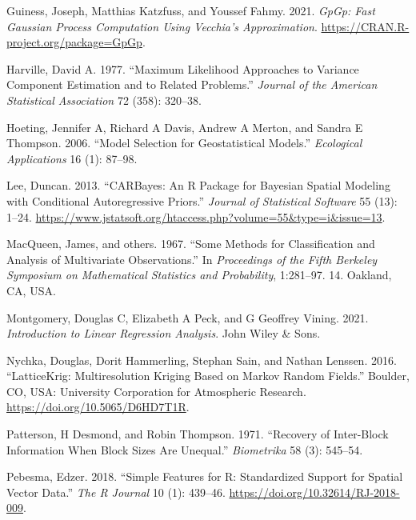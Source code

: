 \documentclass{article}
\newlength{\cslhangindent}
\newlength{\cslentryspacingunit} %
\newenvironment{CSLReferences}[2] %
 {%
  \setlength{\parindent}{0pt}
  \ifodd #1
  \let\oldpar\par
  \def\par{\hangindent=\cslhangindent\oldpar}
  \fi
  \setlength{\parskip}{#2\cslentryspacingunit}
 }%
 {}
\begin{document}
\begin{CSLReferences}{1}{0}
\leavevmode\hypertarget{ref-guiness2021gpgp}{}%
Guiness, Joseph, Matthias Katzfuss, and Youssef Fahmy. 2021. \emph{GpGp:
Fast Gaussian Process Computation Using Vecchia's Approximation}.
\url{https://CRAN.R-project.org/package=GpGp}.

\leavevmode\hypertarget{ref-harville1977maximum}{}%
Harville, David A. 1977. {``Maximum Likelihood Approaches to Variance
Component Estimation and to Related Problems.''} \emph{Journal of the
American Statistical Association} 72 (358): 320--38.

\leavevmode\hypertarget{ref-hoeting2006model}{}%
Hoeting, Jennifer A, Richard A Davis, Andrew A Merton, and Sandra E
Thompson. 2006. {``Model Selection for Geostatistical Models.''}
\emph{Ecological Applications} 16 (1): 87--98.

\leavevmode\hypertarget{ref-lee2013carbayes}{}%
Lee, Duncan. 2013. {``{CARBayes}: An {R} Package for {B}ayesian Spatial
Modeling with Conditional Autoregressive Priors.''} \emph{Journal of
Statistical Software} 55 (13): 1--24.
\url{https://www.jstatsoft.org/htaccess.php?volume=55\&type=i\&issue=13}.

\leavevmode\hypertarget{ref-macqueen1967some}{}%
MacQueen, James, and others. 1967. {``Some Methods for Classification
and Analysis of Multivariate Observations.''} In \emph{Proceedings of
the Fifth Berkeley Symposium on Mathematical Statistics and
Probability}, 1:281--97. 14. Oakland, CA, USA.

\leavevmode\hypertarget{ref-montgomery2021introduction}{}%
Montgomery, Douglas C, Elizabeth A Peck, and G Geoffrey Vining. 2021.
\emph{Introduction to Linear Regression Analysis}. John Wiley \& Sons.

\leavevmode\hypertarget{ref-nychka2016latticekrig}{}%
Nychka, Douglas, Dorit Hammerling, Stephan Sain, and Nathan Lenssen.
2016. {``LatticeKrig: Multiresolution Kriging Based on Markov Random
Fields.''} Boulder, CO, USA: University Corporation for Atmospheric
Research. \url{https://doi.org/10.5065/D6HD7T1R}.

\leavevmode\hypertarget{ref-patterson1971recovery}{}%
Patterson, H Desmond, and Robin Thompson. 1971. {``Recovery of
Inter-Block Information When Block Sizes Are Unequal.''}
\emph{Biometrika} 58 (3): 545--54.

\leavevmode\hypertarget{ref-pebesma2018sf}{}%
Pebesma, Edzer. 2018. {``{Simple Features for R: Standardized Support
for Spatial Vector Data}.''} \emph{{The R Journal}} 10 (1): 439--46.
\url{https://doi.org/10.32614/RJ-2018-009}.


\end{CSLReferences}
\end{document}
